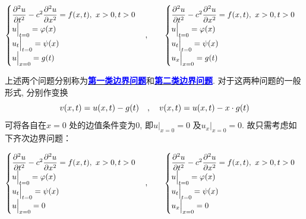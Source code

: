 	\begin{align*}
		\begin{cases}
			\dfrac{\partial^2 u}{\partial t^2} - c^2 \dfrac{\partial^2 u}{\partial x^2} = f(x , t) , \,\, x > 0 , t > 0 \\
			u \Big|_{t = 0} = \varphi(x) \\
			u_t \Big|_{t = 0} = \psi(x) \\
			u \Big|_{x = 0} = g(t)
		\end{cases} , \hspace*{2em} 
		\begin{cases}
			\dfrac{\partial^2 u}{\partial t^2} - c^2 \dfrac{\partial^2 u}{\partial x^2} = f(x , t) , \,\, x > 0 , t > 0 \\
			u \Big|_{t = 0} = \varphi(x) \\
			u_t \Big|_{t = 0} = \psi(x) \\
			u_x \Big|_{x = 0} = g(t)
		\end{cases}
	\end{align*}
	
	\vspace*{2em}
	
	\hspace*{-1.95em}上述两个问题分别称为\underline{\textcolor{blue}{\textbf{第一类边界问题}}}和\underline{\textcolor{blue}{\textbf{第二类边界问题}}}. 对于这两种问题的一般形式, 分别作变换
	\[ v(x , t) = u(x , t) - g(t) \hspace*{1em} , \hspace*{1em} v(x , t) = u(x , t) - x \cdot g(t) \]
	可将各自在$x = 0$ 处的边值条件变为0, 即$u \Big|_{x = 0} = 0$ 及$u_x \Big|_{x = 0} = 0$. 故只需考虑如下齐次边界问题：
	
	\begin{align*}
		\begin{cases}
			\dfrac{\partial^2 u}{\partial t^2} - c^2 \dfrac{\partial^2 u}{\partial x^2} = f(x , t) , \,\, x > 0 , t > 0 \\
			u \Big|_{t = 0} = \varphi(x) \\
			u_t \Big|_{t = 0} = \psi(x) \\
			u \Big|_{x = 0} = 0
		\end{cases} , \hspace*{2em} 
		\begin{cases}
			\dfrac{\partial^2 u}{\partial t^2} - c^2 \dfrac{\partial^2 u}{\partial x^2} = f(x , t) , \,\, x > 0 , t > 0 \\
			u \Big|_{t = 0} = \varphi(x) \\
			u_t \Big|_{t = 0} = \psi(x) \\
			u_x \Big|_{x = 0} = 0
		\end{cases}
	\end{align*}
	
